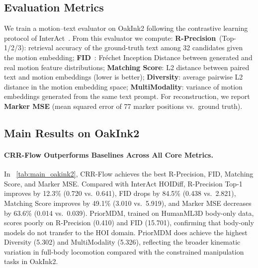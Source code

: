\documentclass[sigconf, screen, review, anonymous]{acmart}
\begin{document}
\subsection{Evaluation Metrics}
\label{sec:metrics}

We train a motion--text evaluator on OakInk2 following the contrastive learning protocol of InterAct~\cite{xu2025interact}.
From this evaluator we compute:
\textbf{R-Precision}~(Top-1/2/3): retrieval accuracy of the ground-truth text among 32 candidates given the motion embedding;
\textbf{FID}~\cite{heusel2017gans}: Fr\'{e}chet Inception Distance between generated and real motion feature distributions;
\textbf{Matching Score}: L2 distance between paired text and motion embeddings (lower is better);
\textbf{Diversity}: average pairwise L2 distance in the motion embedding space;
\textbf{MultiModality}: variance of motion embeddings generated from the same text prompt.
For reconstruction, we report \textbf{Marker MSE} (mean squared error of 77 marker positions vs.\ ground truth).



\subsection{Main Results on OakInk2}
\label{sec:main_results}
\paragraph{CRR-Flow Outperforms Baselines Across All Core Metrics.} In ~\cref{tab:main_oakink2},
CRR-Flow achieves the best R-Precision, FID, Matching Score, and Marker MSE.
Compared with InterAct HOIDiff, R-Precision Top-1 improves by 12.3\% (0.720 vs.\ 0.641), FID drops by 84.5\% (0.438 vs.\ 2.821), Matching Score improves by 49.1\% (3.010 vs.\ 5.919), and Marker MSE decreases by 63.6\% (0.014 vs.\ 0.039).
PriorMDM, trained on HumanML3D body-only data, scores poorly on R-Precision (0.410) and FID (15.701), confirming that body-only models do not transfer to the HOI domain.
PriorMDM does achieve the highest Diversity (5.302) and MultiModality (5.326), reflecting the broader kinematic variation in full-body locomotion compared with the constrained manipulation tasks in OakInk2.
\end{document}
